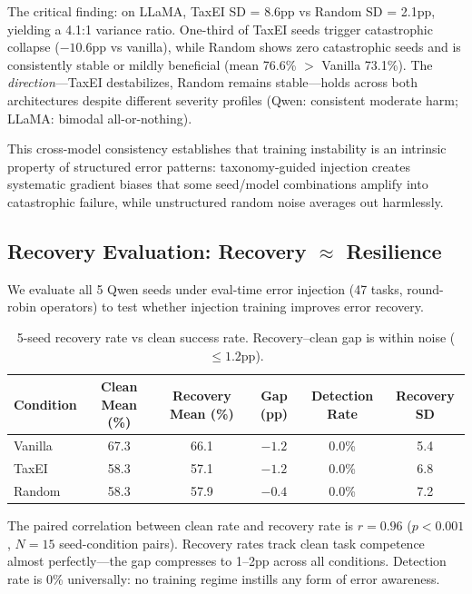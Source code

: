 \documentclass[11pt,a4paper]{article}
\begin{document}
The critical finding: on LLaMA, TaxEI SD = 8.6pp vs Random SD = 2.1pp, yielding a 4.1:1 variance ratio. One-third of TaxEI seeds trigger catastrophic collapse ($-10.6$pp vs vanilla), while Random shows zero catastrophic seeds and is consistently stable or mildly beneficial (mean 76.6\% $>$ Vanilla 73.1\%). The \emph{direction}---TaxEI destabilizes, Random remains stable---holds across both architectures despite different severity profiles (Qwen: consistent moderate harm; LLaMA: bimodal all-or-nothing).

This cross-model consistency establishes that training instability is an intrinsic property of structured error patterns: taxonomy-guided injection creates systematic gradient biases that some seed/model combinations amplify into catastrophic failure, while unstructured random noise averages out harmlessly.

\subsection{Recovery Evaluation: Recovery $\approx$ Resilience}
\label{sec:recovery}

We evaluate all 5 Qwen seeds under eval-time error injection (47 tasks, round-robin operators) to test whether injection training improves error recovery.

\begin{table}[h]
\centering
\caption{5-seed recovery rate vs clean success rate. Recovery--clean gap is within noise ($\leq 1.2$pp).}
\label{tab:recovery}
\begin{tabular}{lccccc}
\toprule
Condition & Clean Mean (\%) & Recovery Mean (\%) & Gap (pp) & Detection Rate & Recovery SD \\
\midrule
Vanilla & 67.3 & 66.1 & $-1.2$ & 0.0\% & 5.4 \\
TaxEI & 58.3 & 57.1 & $-1.2$ & 0.0\% & 6.8 \\
Random & 58.3 & 57.9 & $-0.4$ & 0.0\% & 7.2 \\
\bottomrule
\end{tabular}
\end{table}

The paired correlation between clean rate and recovery rate is $r=0.96$ ($p<0.001$, $N=15$ seed-condition pairs). Recovery rates track clean task competence almost perfectly---the gap compresses to 1--2pp across all conditions. Detection rate is 0\% universally: no training regime instills any form of error awareness.
\end{document}
